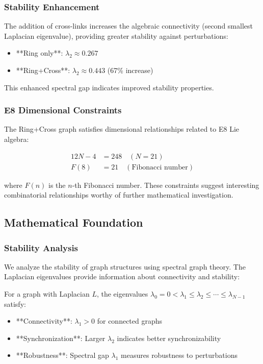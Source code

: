 \documentclass[12pt,a4paper]{article}
\begin{document}
\subsubsection{Stability Enhancement}
The addition of cross-links increases the algebraic connectivity (second smallest Laplacian eigenvalue), providing greater stability against perturbations:

\begin{itemize}
\item **Ring only**: $\lambda_2 \approx 0.267$
\item **Ring+Cross**: $\lambda_2 \approx 0.443$ (67\% increase)
\end{itemize}

This enhanced spectral gap indicates improved stability properties.

\subsubsection{E8 Dimensional Constraints}
The Ring+Cross graph satisfies dimensional relationships related to E8 Lie algebra:

\begin{align}
12N - 4 &= 248 \quad (N=21) \\
F(8) &= 21 \quad (\text{Fibonacci number})
\end{align}

where $F(n)$ is the $n$-th Fibonacci number. These constraints suggest interesting combinatorial relationships worthy of further mathematical investigation.

\subsection{Mathematical Foundation}

\subsubsection{Stability Analysis}
We analyze the stability of graph structures using spectral graph theory. The Laplacian eigenvalues provide information about connectivity and stability:

For a graph with Laplacian $L$, the eigenvalues $\lambda_0 = 0 < \lambda_1 \leq \lambda_2 \leq \cdots \leq \lambda_{N-1}$ satisfy:

\begin{itemize}
\item **Connectivity**: $\lambda_1 > 0$ for connected graphs
\item **Synchronization**: Larger $\lambda_2$ indicates better synchronizability
\item **Robustness**: Spectral gap $\lambda_1$ measures robustness to perturbations
\end{itemize}
\end{document}
